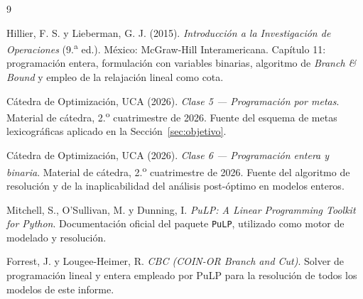 \documentclass[10pt,a4paper]{article}
\begin{document}
\begin{thebibliography}{9}

 Hillier, F. S. y Lieberman, G. J. (2015).
  \emph{Introducción a la Investigación de Operaciones} (9.\textsuperscript{a}
  ed.). México: McGraw-Hill Interamericana. Capítulo 11: programación entera,
  formulación con variables binarias, algoritmo de \emph{Branch \& Bound} y
  empleo de la relajación lineal como cota.

 Cátedra de Optimización, UCA (2026).
  \emph{Clase 5 — Programación por metas}. Material de cátedra,
  2.\textsuperscript{o} cuatrimestre de 2026. Fuente del esquema de metas
  lexicográficas aplicado en la Sección~\ref{sec:objetivo}.

 Cátedra de Optimización, UCA (2026).
  \emph{Clase 6 — Programación entera y binaria}. Material de cátedra,
  2.\textsuperscript{o} cuatrimestre de 2026. Fuente del algoritmo de resolución
  y de la inaplicabilidad del análisis post-óptimo en modelos enteros.

 Mitchell, S., O'Sullivan, M. y Dunning, I.
  \emph{PuLP: A Linear Programming Toolkit for Python}. Documentación oficial
  del paquete \texttt{PuLP}, utilizado como motor de modelado y resolución.

 Forrest, J. y Lougee-Heimer, R.
  \emph{CBC (COIN-OR Branch and Cut)}. Solver de programación lineal y entera
  empleado por PuLP para la resolución de todos los modelos de este informe.

\end{thebibliography}
\end{document}
